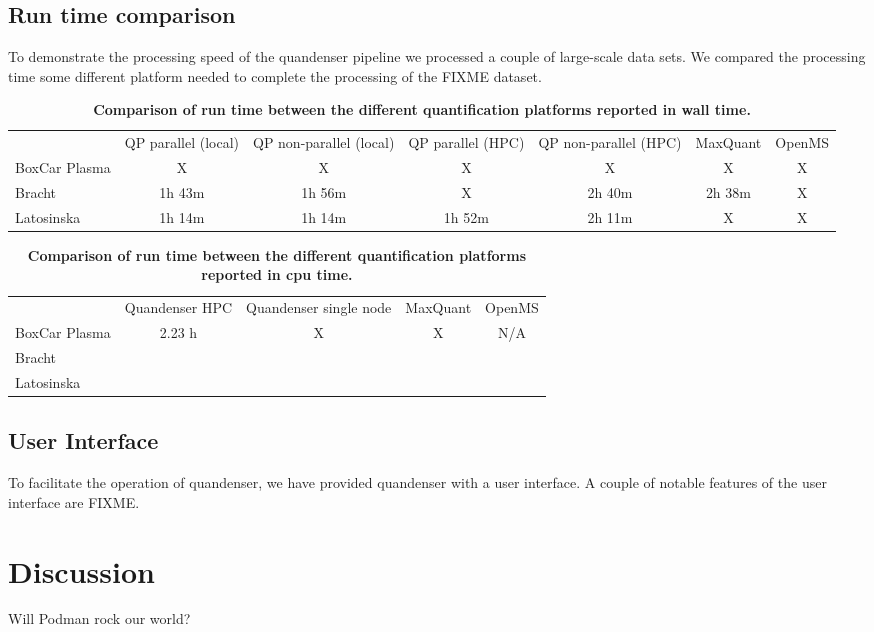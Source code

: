 \documentclass[11pt]{article}
\begin{document}
\subsection*{Run time comparison}

To demonstrate the processing speed of the quandenser pipeline we processed a couple of large-scale data sets. We compared the processing time some different platform needed to complete the processing of the FIXME dataset.
\begin{table}[!h]
  \begin{center}
  \caption{\textbf{Comparison of run time between the different quantification platforms reported in wall time.}}
  \label{table:walltime}
\begin{tabular}{lcccccc}
& QP parallel (local) & QP non-parallel (local) & QP parallel (HPC) & QP non-parallel (HPC) & MaxQuant & OpenMS \\
BoxCar Plasma & X & X & X & X & X & X \\
Bracht & 1h 43m & 1h 56m & X & 2h 40m & 2h 38m & X \\
Latosinska & 1h 14m & 1h 14m & 1h 52m & 2h 11m & X & X \\
\end{tabular}
\end{center}
\end{table}

\begin{table}
  \caption{\textbf{Comparison of run time between the different quantification platforms reported in cpu time.}}
  \label{table:cputime}
\begin{tabular}{lcccc}
& Quandenser HPC & Quandenser single node & MaxQuant & OpenMS \\
BoxCar Plasma & 2.23 h & X & X & N/A \\
Bracht &  & &&  \\
Latosinska & &&& \\
\end{tabular}

\end{table}


\subsection*{User Interface}

To facilitate the operation of quandenser, we have provided quandenser with a user interface. A couple of notable features of the user interface are FIXME.

\section*{Discussion}

Will Podman rock our world?




\end{document}
